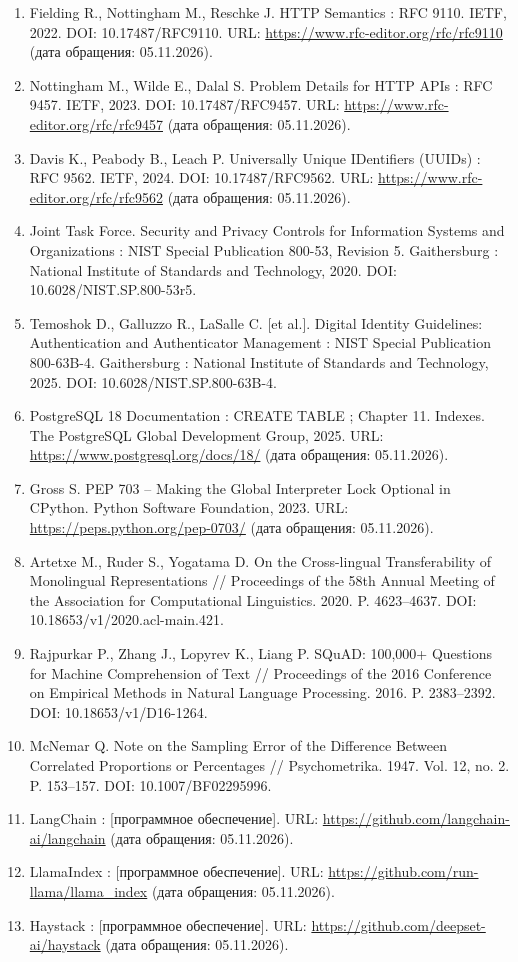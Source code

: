 \documentclass[14pt,a4paper]{extarticle}
\begin{document}
\begin{singlespace*}
\begin{enumerate}
\item Fielding R., Nottingham M., Reschke J. HTTP Semantics : RFC 9110. IETF, 2022. DOI: 10.17487/RFC9110. URL: \url{https://www.rfc-editor.org/rfc/rfc9110} (дата обращения: 05.11.2026).
\item Nottingham M., Wilde E., Dalal S. Problem Details for HTTP APIs : RFC 9457. IETF, 2023. DOI: 10.17487/RFC9457. URL: \url{https://www.rfc-editor.org/rfc/rfc9457} (дата обращения: 05.11.2026).
\item Davis K., Peabody B., Leach P. Universally Unique IDentifiers (UUIDs) : RFC 9562. IETF, 2024. DOI: 10.17487/RFC9562. URL: \url{https://www.rfc-editor.org/rfc/rfc9562} (дата обращения: 05.11.2026).
\item \foreignlanguage{english}{Joint Task Force. Security and Privacy Controls for Information Systems and Organizations : NIST Special Publication 800-53, Revision 5. Gaithersburg : National Institute of Standards and Technology, 2020. DOI: 10.6028/NIST.SP.800-53r5.}
\item \foreignlanguage{english}{Temoshok D., Galluzzo R., LaSalle C. [et al.]. Digital Identity Guidelines: Authentication and Authenticator Management : NIST Special Publication 800-63B-4. Gaithersburg : National Institute of Standards and Technology, 2025. DOI: 10.6028/NIST.SP.800-63B-4.}
\item PostgreSQL 18 Documentation : CREATE TABLE ; Chapter 11. Indexes. The PostgreSQL Global Development Group, 2025. URL: \url{https://www.postgresql.org/docs/18/} (дата обращения: 05.11.2026).
\item Gross S. PEP 703 – Making the Global Interpreter Lock Optional in CPython. Python Software Foundation, 2023. URL: \url{https://peps.python.org/pep-0703/} (дата обращения: 05.11.2026).
\item \foreignlanguage{english}{Artetxe M., Ruder S., Yogatama D. On the Cross-lingual Transferability of Monolingual Representations // Proceedings of the 58th Annual Meeting of the Association for Computational Linguistics. 2020. P. 4623–4637. DOI: 10.18653/v1/2020.acl-main.421.}
\item \foreignlanguage{english}{Rajpurkar P., Zhang J., Lopyrev K., Liang P. SQuAD: 100,000+ Questions for Machine Comprehension of Text // Proceedings of the 2016 Conference on Empirical Methods in Natural Language Processing. 2016. P. 2383–2392. DOI: 10.18653/v1/D16-1264.}
\item \foreignlanguage{english}{McNemar Q. Note on the Sampling Error of the Difference Between Correlated Proportions or Percentages // Psychometrika. 1947. Vol. 12, no. 2. P. 153–157. DOI: 10.1007/BF02295996.}
\item LangChain : [программное обеспечение]. URL: \url{https://github.com/langchain-ai/langchain} (дата обращения: 05.11.2026).
\item LlamaIndex : [программное обеспечение]. URL: \url{https://github.com/run-llama/llama_index} (дата обращения: 05.11.2026).
\item Haystack : [программное обеспечение]. URL: \url{https://github.com/deepset-ai/haystack} (дата обращения: 05.11.2026).
\end{enumerate}
\end{singlespace*}
\end{document}
